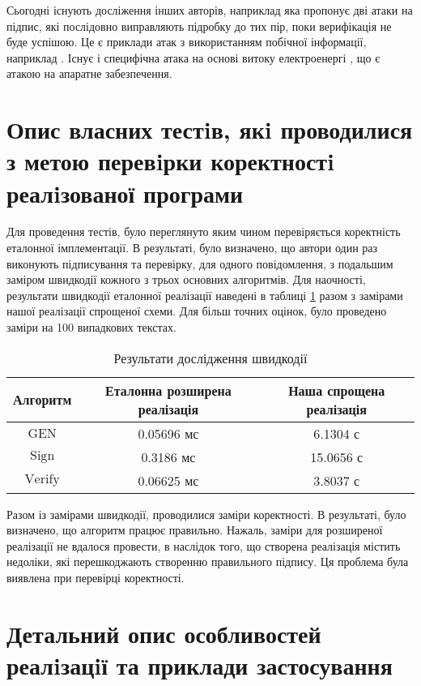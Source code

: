 \documentclass[12pt]{HomusWorkus}
\begin{document}
Сьогодні існують досліження інших авторів, наприклад \cite{Krahmer24} яка пропонує дві атаки на підпис, які послідовно виправляють підробку до тих пір, поки верифікація не буде успішою. Це є приклади атак з використанням побічної інформації, наприклад \cite{Ravi2018}. Існує і специфічна атака на основі витоку електроенергі \cite{Wang2023}, що є атакою на апаратне забезпечення.

\section{Опис власних тестiв, якi проводилися з метою перевiрки коректностi реалiзованої програми}

Для проведення тестів, було переглянуто яким чином перевіряється коректність еталонної імплементації. В результаті, було визначено, що автори один раз виконують підписування та перевірку, для одного повідомлення, з подальшим заміром швидкодії кожного з трьох основних алгоритмів.
Для наочності, результати швидкодії еталонної реалізації наведені в таблиці \ref{tab:speeeeed} разом з замірами нашої реалізації спрощеної схеми. Для більш точних оцінок, було проведено заміри на 100 випадкових текстах. 

\begin{table}[ht]
    \centering
    \begin{tabular}{|c|c|c|}
        \hline
        Алгоритм & Еталонна розширена реалізація & Наша спрощена реалізація \\\hline
        $\mathrm{GEN}$ & 0.05696 мс & 6.1304 с \\\hline
        $\mathrm{Sign}$ & 0.3186 мс & 15.0656 с \\\hline
        $\mathrm{Verify}$ & 0.06625 мс & 3.8037 с \\\hline
        \hline
    \end{tabular}
    \caption{Результати дослідження швидкодії}
    \label{tab:speeeeed}
\end{table}

Разом із замірами швидкодії, проводилися заміри коректності. В результаті, було визначено, що алгоритм працює правильно.
Нажаль, заміри для розширеної реалізації не вдалося провести, в наслідок того, що створена реалізація містить недоліки, які перешкоджають створенню правильного підпису. Ця проблема була виявлена при перевірці коректності.


\section{Детальний опис особливостей реалiзацiї та приклади застосування}
\end{document}
